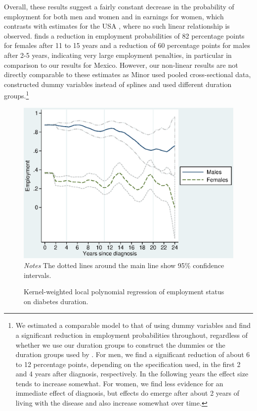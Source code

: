 Overall, these results suggest a fairly constant decrease in the probability of employment for both men and women and in earnings for women, which contrasts with estimates for the USA \parencite{Minor2013}, where no such linear relationship is observed.  \textcite{Minor2013} finds a reduction in employment probabilities of 82 percentage points for females after 11 to 15 years and a reduction of 60 percentage points for males after 2-5 years, indicating very large employment penalties, in particular in comparison to our results for Mexico. However, our non-linear results are not directly comparable to these estimates as Minor used pooled cross-sectional data, constructed dummy variables instead of splines and used different duration groups.\footnote{We estimated a comparable model to that of \textcite{Minor2013} using dummy variables and find a significant reduction in employment probabilities throughout, regardless of whether we use our duration groups to construct the dummies or the duration groups used by \textcite{Minor2013}. For men, we find a significant reduction of about 6 to 12 percentage points, depending on the specification used, in the first 2 and 4 years after diagnosis, respectively. In the following years the effect size tends to increase somewhat. For women, we find less evidence for an immediate effect of diagnosis, but effects do emerge after about 2 years of living with the disease and also increase somewhat over time.}



  
\newpage
\begin{figure}[h!]
\caption{\label{fig:Kernel-weighted-local-polynomial_empl}Kernel-weighted local
polynomial regression of employment status on diabetes duration.}%
\begin{center}
\includegraphics[width=\linewidth]{Chapter4/Figures/lpoly_works_diabetesduration.eps}\\
\footnotesize{\textit{Notes} The dotted lines around the main line show 95\% confidence intervals.}
\end{center}
\end{figure}

